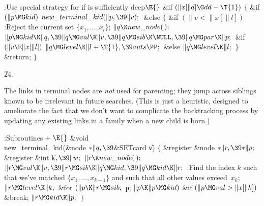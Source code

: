 \Y\B\4:Use special strategy for  if  is
sufficiently deep\X${}\E{}$\6
\&{if} ${}(\|x[\|d]\G\\{dd}-\T{1}){}$\5
${}\{{}$\1\6
\&{if} ${}(\|p\MG\\{kid}){}$\1\5
${}\\{new\_terminal\_kid}(\|p,\39\|v);{}$\2\6
\&{else}\5
${}\{{}$\1\6
\&{if} ${}(\|v<\|x[\|l]){}$\1\5
:Reject the current set $\{x_1,\ldots,x_l\}$\X;\2\6
${}\|q\K\\{new\_node}(\,);{}$\6
${}\|p\MG\\{kid}\K\|q,\39\|q\MG\\{val}\K\|v,\39\|q\MG\\{sib}\K\NULL,\39\|q\MG%
\\{par}\K\|p;{}$\6
\&{if} ${}(\|v\E\|x[\|l]){}$\1\5
${}\|q\MG\\{level}\K\|l+\T{1},\39\\{auts}\PP;{}$\2\6
\&{else}\1\5
${}\|q\MG\\{level}\K\|l;{}$\2\6
\4${}\}{}$\2\6
\&{return};\6
\4${}\}{}$\2\par
\U24.\fi

The  links in terminal nodes are {\it not\/} used for
parenting; they jump across siblings known to be irrelevant in future
searches. (This is just a heuristic, designed to ameliorate the fact
that we don't want to complicate the backtracking process by updating
any existing links in a family when a new child is born.)

\Y\B\4:Subroutines\X${}\mathrel+\E{}$\6
\1\1\&{void} \\{new\_terminal\_kid}(\&{node} ${}{*}\|q,\39{}$\&{SETcard} \|v)\2%
\2\6
${}\{{}$\1\6
\&{register} \&{node} ${}{*}\|r,\39{*}\|p;{}$\6
\&{register} \&{int} \|k${},\39\|w;{}$\7
${}\|r\K\\{new\_node}(\,);{}$\6
${}\|r\MG\\{val}\K\|v,\39\|r\MG\\{sib}\K\|q\MG\\{kid},\39\|q\MG\\{kid}\K\|r;{}$%
\6
:Find the index $k$ such that we've matched $\{x_1,\ldots,x_{k-1}\}$ and
such that all other values exceed~$x_k$\X;\6
${}\|r\MG\\{level}\K\|k;{}$\6
\&{for} ${}(\|p\K\|r\MG\\{sib};{}$ \|p; ${}\|p\K\|p\MG\\{kid}){}$\1\6
\&{if} ${}(\|p\MG\\{val}>\|x[\|k]){}$\1\5
\&{break};\2\2\6
${}\|r\MG\\{kid}\K\|p;{}$\6
\4${}\}{}$\2\par
\fi

